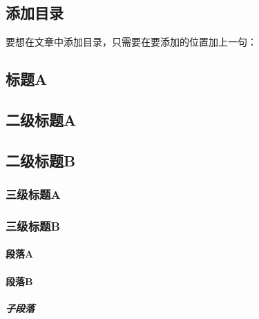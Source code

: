     \subsection{添加目录}
    要想在文章中添加目录，只需要在要添加的位置加上一句：
    \begin{texsepcode}
        \begin{texcodenoshad}
            \tableofcontents
            \section{标题A}
            \subsection{二级标题A}
            \subsection{二级标题B}
            \subsubsection{三级标题A}
            \subsubsection{三级标题B}
            \paragraph{段落A}
            \paragraph{段落B}
            \subparagraph{子段落}

\end{texcodenoshad}
\end{texsepcode}
